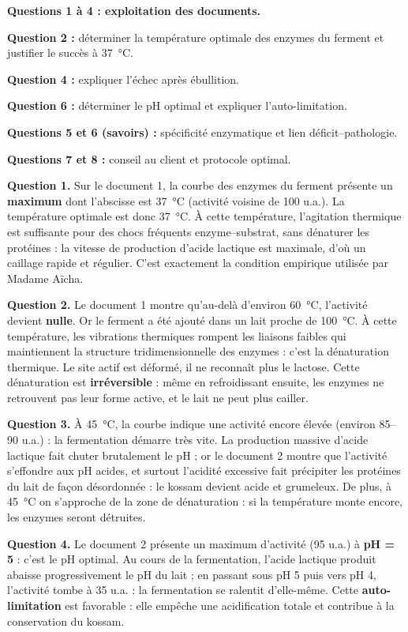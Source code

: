 \documentclass[11pt]{article}
\newcommand{\cle}[1]{{\popxbold\color{popdark}#1}}
\begin{document}
\begin{exoresolu}
\textbf{Questions 1 à 4 : exploitation des documents.}

\textbf{Question 2 :} déterminer la température optimale des enzymes du ferment et justifier le succès à \SI{37}{\celsius}.

\textbf{Question 4 :} expliquer l'échec après ébullition.

\textbf{Question 6 :} déterminer le pH optimal et expliquer l'auto-limitation.

\textbf{Questions 5 et 6 (savoirs) :} spécificité enzymatique et lien déficit--pathologie.

\textbf{Questions 7 et 8 :} conseil au client et protocole optimal.

\tcblower
\textbf{Question 1.} Sur le document 1, la courbe des enzymes du ferment présente un \textbf{maximum} dont l'abscisse est \SI{37}{\celsius} (activité voisine de 100 u.a.). La température optimale est donc \SI{37}{\celsius}. À cette température, l'agitation thermique est suffisante pour des chocs fréquents enzyme--substrat, sans dénaturer les protéines : la vitesse de production d'acide lactique est maximale, d'où un caillage rapide et régulier. C'est exactement la condition empirique utilisée par Madame Aïcha.

\textbf{Question 2.} Le document 1 montre qu'au-delà d'environ \SI{60}{\celsius}, l'activité devient \textbf{nulle}. Or le ferment a été ajouté dans un lait proche de \SI{100}{\celsius}. À cette température, les vibrations thermiques rompent les liaisons faibles qui maintiennent la structure tridimensionnelle des enzymes : c'est la \cle{dénaturation thermique}. Le site actif est déformé, il ne reconnaît plus le lactose. Cette dénaturation est \textbf{irréversible} : même en refroidissant ensuite, les enzymes ne retrouvent pas leur forme active, et le lait ne peut plus cailler.

\textbf{Question 3.} À \SI{45}{\celsius}, la courbe indique une activité encore élevée (environ 85--90 u.a.) : la fermentation démarre très vite. La production massive d'acide lactique fait chuter brutalement le pH ; or le document 2 montre que l'activité s'effondre aux pH acides, et surtout l'acidité excessive fait précipiter les protéines du lait de façon désordonnée : le kossam devient acide et grumeleux. De plus, à \SI{45}{\celsius} on s'approche de la zone de dénaturation : si la température monte encore, les enzymes seront détruites.

\textbf{Question 4.} Le document 2 présente un maximum d'activité (95 u.a.) à \textbf{pH = 5} : c'est le pH optimal. Au cours de la fermentation, l'acide lactique produit abaisse progressivement le pH du lait ; en passant sous pH 5 puis vers pH 4, l'activité tombe à 35 u.a. : la fermentation se ralentit d'elle-même. Cette \textbf{auto-limitation} est favorable : elle empêche une acidification totale et contribue à la conservation du kossam.


\end{exoresolu}
\end{document}
